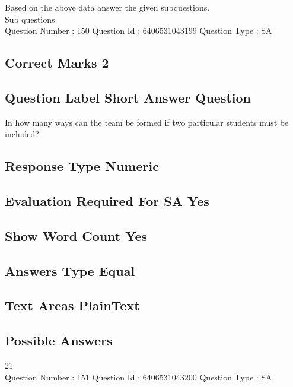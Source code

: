 \documentclass{article}
\begin{document}
Based on the above data answer the given subquestions.\\

Sub questions\\

Question Number : 150 Question Id : 6406531043199 Question Type : SA\\

\subsection{Correct Marks  2}

\subsection{Question Label  Short Answer Question}

In how many ways can the team be formed if two particular students must be included?\\

\subsection{Response Type  Numeric}

\subsection{Evaluation Required For SA  Yes}

\subsection{Show Word Count  Yes}

\subsection{Answers Type  Equal}

\subsection{Text Areas  PlainText}

\subsection{Possible Answers }

21\\

Question Number : 151 Question Id : 6406531043200 Question Type : SA\\
\end{document}
